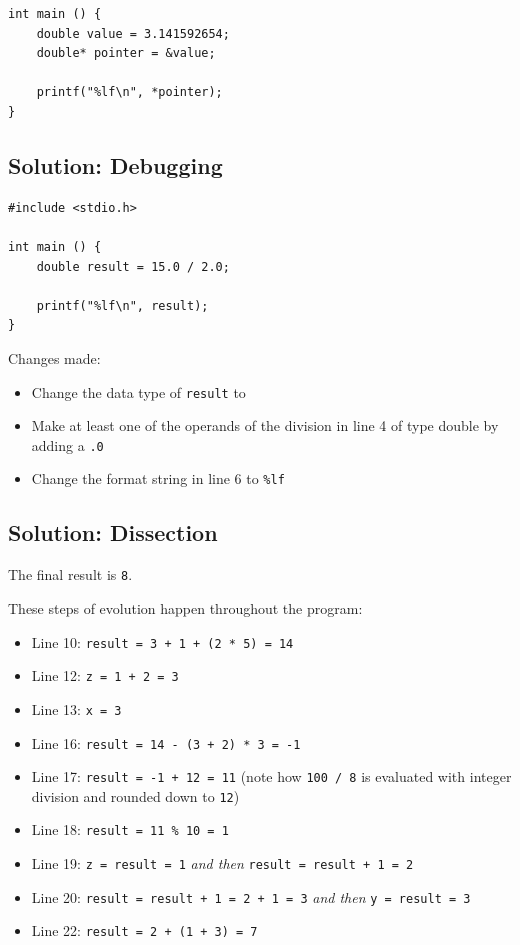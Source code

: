 {{{{\begin{codebox}[exo3-1.c]
\begin{verbatim}
int main () {
    double value = 3.141592654;
    double* pointer = &value;

    printf("%lf\n", *pointer);
}
\end{verbatim}
\end{codebox}

\subsection*{Solution: Debugging}
\begin{codebox}[exo3-2.c]
\begin{verbatim}
#include <stdio.h>

int main () {
    double result = 15.0 / 2.0;
   
    printf("%lf\n", result);
}
\end{verbatim}
\end{codebox}
Changes made:
\begin{itemize}
\item Change the data type of \texttt{result} to 
\item Make at least one of the operands of the division in line 4 of type double by adding a \texttt{.0}
\item Change the format string in line 6 to \texttt{\%lf}
\end{itemize}

\subsection*{Solution: Dissection}
The final result is \texttt{8}.

These steps of evolution happen throughout the program:
\begin{itemize}
\item Line 10: \texttt{result = 3 + 1 + (2 * 5) = 14}
\item Line 12: \texttt{z = 1 + 2 = 3}
\item Line 13: \texttt{x = 3}
\item Line 16: \texttt{result = 14 - (3 + 2) * 3 = -1}
\item Line 17: \texttt{result = -1 + 12 = 11} (note how \texttt{100 / 8} is evaluated with integer division and rounded down to \texttt{12})
\item Line 18: \texttt{result = 11 \% 10 = 1}
\item Line 19: \texttt{z = result = 1} \emph{and then} \texttt{result = result + 1 = 2}
\item Line 20: \texttt{result = result + 1 = 2 + 1 = 3} \emph{and then} \texttt{y = result = 3}
\item Line 22: \texttt{result = 2 + (1 + 3) = 7}
\end{itemize}

}}}}
